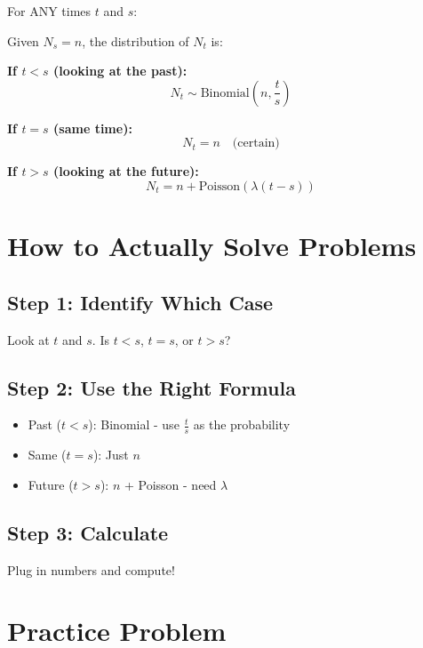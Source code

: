 \documentclass[11pt]{article}
\begin{document}
For ANY times $t$ and $s$:

\begin{tcolorbox}[colback=yellow!10!white,colframe=orange!75!black,title=Complete Answer]
Given $N_s = n$, the distribution of $N_t$ is:

\vspace{0.3cm}

\textbf{If $t < s$ (looking at the past):}
\[
N_t \sim \text{Binomial}\left(n, \frac{t}{s}\right)
\]

\vspace{0.3cm}

\textbf{If $t = s$ (same time):}
\[
N_t = n \quad \text{(certain)}
\]

\vspace{0.3cm}

\textbf{If $t > s$ (looking at the future):}
\[
N_t = n + \text{Poisson}(\lambda(t - s))
\]
\end{tcolorbox}

\section{How to Actually Solve Problems}

\subsection{Step 1: Identify Which Case}

Look at $t$ and $s$. Is $t < s$, $t = s$, or $t > s$?

\subsection{Step 2: Use the Right Formula}

\begin{itemize}
    \item Past ($t < s$): Binomial - use $\frac{t}{s}$ as the probability
    \item Same ($t = s$): Just $n$
    \item Future ($t > s$): $n$ + Poisson - need $\lambda$
\end{itemize}

\subsection{Step 3: Calculate}

Plug in numbers and compute!

\section{Practice Problem}
\end{document}
